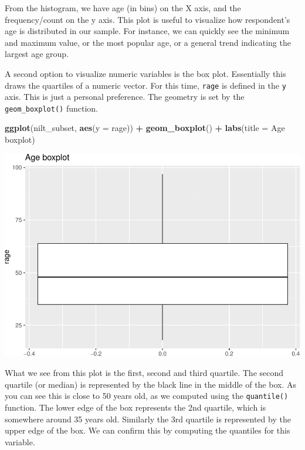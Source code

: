 \documentclass[
]{book}
\newenvironment{Shaded}{\begin{snugshade}}{\end{snugshade}}
\newcommand{\AttributeTok}[1]{\textcolor[rgb]{0.13,0.29,0.53}{#1}}
\newcommand{\FunctionTok}[1]{\textcolor[rgb]{0.13,0.29,0.53}{\textbf{#1}}}
\newcommand{\NormalTok}[1]{#1}
\newcommand{\SpecialCharTok}[1]{\textcolor[rgb]{0.81,0.36,0.00}{\textbf{#1}}}
\newcommand{\StringTok}[1]{\textcolor[rgb]{0.31,0.60,0.02}{#1}}
\begin{document}
From the histogram, we have age (in bins) on the X axis, and the frequency/count on the y axis. This plot is useful to visualize how respondent's age is distributed in our sample. For instance, we can quickly see the minimum and maximum value, or the most popular age, or a general trend indicating the largest age group.

A second option to visualize numeric variables is the box plot. Essentially this draws the quartiles of a numeric vector. For this time, \texttt{rage} is defined in the \texttt{y} axis. This is just a personal preference. The geometry is set by the \texttt{geom\_boxplot()} function.

\begin{Shaded}
\begin{Highlighting}[]
\FunctionTok{ggplot}\NormalTok{(nilt\_subset, }\FunctionTok{aes}\NormalTok{(}\AttributeTok{y =}\NormalTok{ rage)) }\SpecialCharTok{+}
  \FunctionTok{geom\_boxplot}\NormalTok{() }\SpecialCharTok{+}
  \FunctionTok{labs}\NormalTok{(}\AttributeTok{title =} \StringTok{\textquotesingle{}Age boxplot\textquotesingle{}}\NormalTok{)}
\end{Highlighting}
\end{Shaded}

\begin{flushleft}\includegraphics[width=1\linewidth]{lab-workbook_files/figure-latex/unnamed-chunk-69-1} \end{flushleft}

What we see from this plot is the first, second and third quartile. The second quartile (or median) is represented by the black line in the middle of the box. As you can see this is close to 50 years old, as we computed using the \texttt{quantile()} function. The lower edge of the box represents the 2nd quartile, which is somewhere around 35 years old. Similarly the 3rd quartile is represented by the upper edge of the box. We can confirm this by computing the quantiles for this variable.
\end{document}
